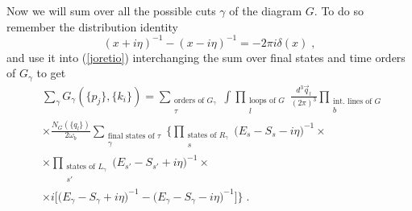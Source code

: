 \documentclass[%
 reprint,
 amsmath,amssymb,
 aps,
]{revtex4-1}
\begin{document}

Now we will sum over all the possible cuts $\gamma$ of the diagram $G$. To do so remember the distribution identity 
\begin{equation}
(x+i\eta)^{-1}-(x-i\eta)^{-1}=-2\pi i\delta(x)\;,
\end{equation}
and use it into (\ref{joretio}) interchanging the sum over final states and time orders of $G_\gamma$ to get
\begin{align}
&\sum_{\gamma} G_\gamma(\{p_j\},\{k_i\})=\sum_{\substack{\text{orders of $G_\gamma$} \\ \tau}}\int\prod_{\substack{\text{loops of $G$} \\ l}}\frac{d^3\vec{q}_l}{(2\pi)^3}\prod_{\substack{\text{int. lines of $G$} \\ b}}\nonumber\\
&\times\frac{N_{G}(\{q_l\})}{2\omega_b}\sum_{\substack{\text{final states of  $\tau$} \\ \gamma}}\Big\{\prod_{\substack{\text{states of $R_\gamma$} \\ s}}\Big(E_s-S_s-i\eta\Big)^{-1}\nonumber\times\\
&\times\prod_{\substack{\text{states of $L_\gamma$} \\ s'}}\Big(E_{s'}-S_{s'}+i\eta\Big)^{-1}\nonumber\times\\
&\times i\Big[\Big(E_\gamma-S_\gamma+i\eta\Big)^{-1}-\Big(E_\gamma-S_\gamma-i\eta\Big)^{-1}\Big]\Big\}\;.\label{houlot}
\end{align}
\end{document}
